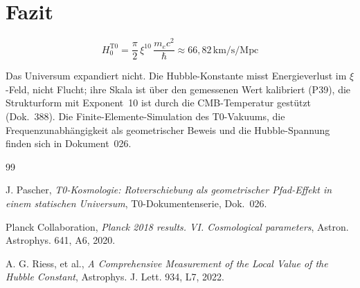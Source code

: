 \section{Fazit}

	\begin{equation}
		\boxed{H_0^{\text{T0}} = \frac{\pi}{2}\,\xi^{10}\,\frac{m_e c^2}{\hbar} \approx 66{,}82\,\text{km/s/Mpc}}
	\end{equation}

	Das Universum expandiert nicht. Die Hubble-Konstante misst Energieverlust im $\xi$-Feld, nicht Flucht; ihre Skala ist über den gemessenen Wert kalibriert (P39), die Strukturform mit Exponent~10 ist durch die CMB-Temperatur gestützt (Dok.~388). Die Finite-Elemente-Simulation des T0-Vakuums, die Frequenzunabhängigkeit als geometrischer Beweis und die Hubble-Spannung finden sich in Dokument~026.

	\begin{thebibliography}{99}

		J. Pascher, \textit{T0-Kosmologie: Rotverschiebung als geometrischer Pfad-Effekt in einem statischen Universum}, T0-Dokumentenserie, Dok.~026.

		Planck Collaboration, \textit{Planck 2018 results. VI. Cosmological parameters}, Astron. Astrophys. 641, A6, 2020.

		A. G. Riess, et al., \textit{A Comprehensive Measurement of the Local Value of the Hubble Constant}, Astrophys. J. Lett. 934, L7, 2022.

	\end{thebibliography}
